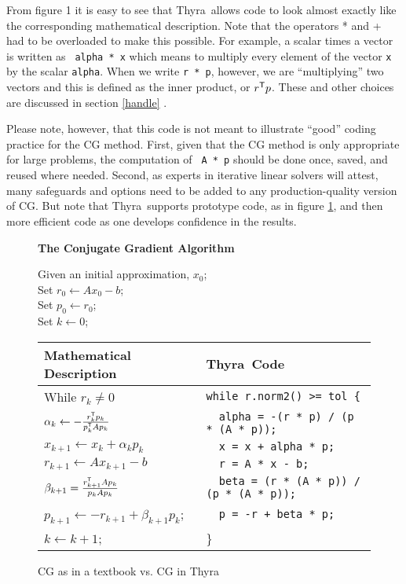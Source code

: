 \documentclass[12pt]{article}
\newcommand{\trp}{^{\sf T}}
\newcommand{\thyra}{{\sf Thyra}}
\begin{document}
From figure 1 it is easy to see that \thyra\ allows code to look
almost exactly like the corresponding mathematical description.  Note
that the operators * and + had to be overloaded to make this
possible.  For example, a scalar times a vector is written as {\tt
  alpha * x} which means to multiply every element of the vector {\tt x} by
the scalar {\tt alpha}.  When we write {\tt r * p}, however, we are
``multiplying'' two vectors and this is defined as the inner product,
or $r \trp p$.  These and other choices are discussed in section
\ref{handle} .

Please note, however, that this code is not meant to illustrate
``good'' coding practice for the CG method.  First, given that the CG
method is only appropriate for large problems, the computation of {\tt
A * p}
should be done once, saved, and reused where needed.  Second, as
experts in iterative linear solvers will attest, many safeguards and
options need to be added to any production-quality version of CG. But
note that \thyra\ supports prototype code, as in figure \ref{fig11},
and then more efficient code as one develops confidence in the results.


\begin{figure}[t] \label{fig11}
\begin{center}
{\bf The Conjugate Gradient Algorithm} 
\end{center}
\begin{minipage}[t]{.6\textwidth}Given an initial approximation, $x_0$; \\
      Set $r_0 \leftarrow Ax_0 - b$; \\
      Set $p_0 \leftarrow r_0$; \\
      Set $k \leftarrow 0$; \\
\end{minipage}
      
\begin{tabular}{|l|l|} \hline
Mathematical Description& \thyra\ Code \\ \hline
While $r_k \neq 0$     & {\tt while r.norm2() \verb+>+= tol \{} \\
$\alpha_k \leftarrow -\frac{r_k \trp p_k}{p_k\trp Ap_k}$ & {\tt \ \  alpha = -(r *
p) / (p * (A * p));} \\
$x_{k+1} \leftarrow x_k + \alpha_k p_k$ & {\tt \ \ x = x + alpha * p;} \\
$r_{k+1} \leftarrow Ax_{k+1} - b$    & {\tt \ \ r = A * x - b;} \\
$\beta_{k+1} = \frac{r_{k+1}\trp A p_k}{p_kAp_k}$   & {\tt \ \ beta = (r * (A *
p)) / (p * (A * p));} \\
$p_{k+1} \leftarrow - r_{k+1} + \beta_{k+1} p_k$;  & {\tt \ \ p = -r + beta *
p;} \\
$k \leftarrow k + 1$;   & \} \\ \hline
\end{tabular}
\caption{CG as in a textbook vs. CG in \thyra}
\end{figure}
\end{document}
